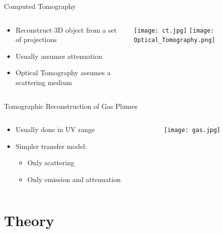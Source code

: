 \documentclass[compress,red,12pt]{beamer}
\begin{document}
\begin{frame}{Computed Tomography}
  \begin{columns}[T]
    \begin{column}{.7\textwidth}
      \begin{itemize}
      \item Reconstruct 3D object from a set of projections
      \item Usually assumes attenuation
      \item Optical Tomography assumes a scattering medium
      \end{itemize}
    \end{column}
    \begin{column}{.3\textwidth}
      \centering
      \texttt{[image: ct.jpg]}
      \texttt{[image: Optical\_Tomography.png]}
    \end{column}
  \end{columns}  
\end{frame}

\begin{frame}[T]{Tomographic Reconstruction of Gas Plumes}
  \begin{columns}[T]
    \begin{column}{.7\textwidth}
      \begin{itemize}
      \item Usually done in UV range
      \item Simpler transfer model:
        \begin{itemize}
        \item Only scattering
        \item Only emission and attenuation
        \end{itemize}
      \end{itemize}
    \end{column}
    \begin{column}{.3\textwidth}
      \texttt{[image: gas.jpg]}
    \end{column}
  \end{columns}    
\end{frame}



\section{Theory}
\end{document}
